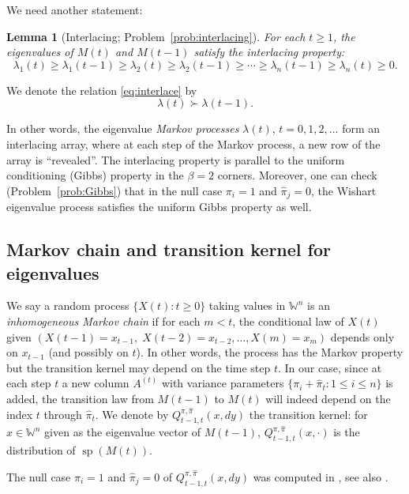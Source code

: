 \documentclass[letterpaper,11pt,oneside,reqno]{article}
\numberwithin{equation}{section}
\newtheorem{lemma}[proposition]{Lemma}
\theoremstyle{definition}
\begin{document}
We need another statement:
\begin{lemma}[Interlacing; Problem~\ref{prob:interlacing}]
\label{lemma:interlacing}
For each $t\geq 1$, the eigenvalues of $M(t)$ and $M(t-1)$ satisfy the interlacing property:
\begin{equation}
	\label{eq:interlace}
	\lambda_1(t) \geq \lambda_1(t-1) \geq \lambda_2(t) \geq \lambda_2(t-1) \geq \cdots \geq \lambda_n(t-1) \geq \lambda_n(t) \geq 0.
\end{equation}
\end{lemma}
We denote the relation \eqref{eq:interlace} by
\begin{equation}
	\label{eq:interlace-notation}
	\lambda(t) \succ \lambda(t-1).
\end{equation}

In other words, the eigenvalue \emph{Markov processes}
$\lambda(t)$, $t=0,1,2,\ldots $
form an interlacing array, where at each step of the Markov process,
a new row of the array is ``revealed''.
The interlacing property is parallel to
the uniform conditioning (Gibbs) property in the $\beta=2$ corners. Moreover,
one can check (Problem~\ref{prob:Gibbs}) that
in the null case
$\pi_i=1$ and $\hat\pi_j=0$,
the Wishart eigenvalue process satisfies the
uniform Gibbs property as well.

\subsection{Markov chain and transition kernel for eigenvalues}
We say a random process $\{X(t):t\ge0\}$ taking values in
$\mathbb{W}^n$ is an \emph{inhomogeneous Markov chain} if
for each $m<t$, the conditional law of $X(t)$ given
$(X(t-1)=x_{t-1},\;X(t-2)=x_{t-2},\dots,X(m)=x_m)$ depends
only on $x_{t-1}$ (and possibly on $t$). In other words, the
process has the Markov property but the transition kernel
may depend on the time step $t$. In our case, since at each
step $t$ a new column $A^{(t)}$ with variance parameters
$\{\pi_i+\hat\pi_t:1\le i\le n\}$ is added, the transition
law from $M(t-1)$ to $M(t)$ will indeed depend on the index
$t$ through $\hat\pi_t$. We denote by
$Q^{\pi,\hat\pi}_{t-1,t}(x,dy)$ the transition kernel: for
$x\in \mathbb{W}^n$ given as the eigenvalue vector of
$M(t-1)$, $Q^{\pi,\hat\pi}_{t-1,t}(x,\cdot)$ is the
distribution of $\operatorname{sp}(M(t))$.

The null case $\pi_i=1$ and $\hat\pi_j=0$ of $Q^{\pi,\hat\pi}_{t-1,t}(x,dy)$
was computed in \cite{defosseux2010orbit}, see also
\cite{forrester2006jacobians}.
\end{document}
